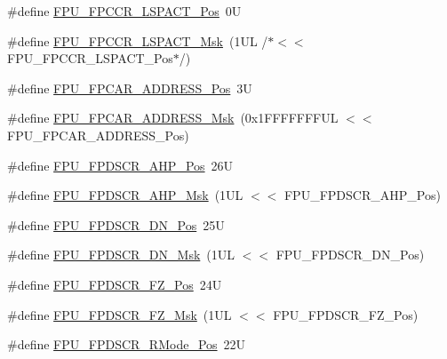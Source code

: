 \begin{DoxyCompactItemize}
\item 
\#define \mbox{\hyperlink{group___c_m_s_i_s___f_p_u_ga803bf3f6d15b04deaad0801bee5b35ed}{F\+P\+U\+\_\+\+F\+P\+C\+C\+R\+\_\+\+L\+S\+P\+A\+C\+T\+\_\+\+Pos}}~0U
\item 
\#define \mbox{\hyperlink{group___c_m_s_i_s___f_p_u_ga86e7c2fa52ba65c3b535dfa33f2586eb}{F\+P\+U\+\_\+\+F\+P\+C\+C\+R\+\_\+\+L\+S\+P\+A\+C\+T\+\_\+\+Msk}}~(1\+U\+L /$\ast$$<$$<$ F\+P\+U\+\_\+\+F\+P\+C\+C\+R\+\_\+\+L\+S\+P\+A\+C\+T\+\_\+\+Pos$\ast$/)
\item 
\#define \mbox{\hyperlink{group___c_m_s_i_s___f_p_u_gaf45377b7e45be8517ddbcf2028b80ae7}{F\+P\+U\+\_\+\+F\+P\+C\+A\+R\+\_\+\+A\+D\+D\+R\+E\+S\+S\+\_\+\+Pos}}~3U
\item 
\#define \mbox{\hyperlink{group___c_m_s_i_s___f_p_u_ga517d89370c81325c5387b9c3085ac554}{F\+P\+U\+\_\+\+F\+P\+C\+A\+R\+\_\+\+A\+D\+D\+R\+E\+S\+S\+\_\+\+Msk}}~(0x1\+F\+F\+F\+F\+F\+F\+F\+U\+L $<$$<$ F\+P\+U\+\_\+\+F\+P\+C\+A\+R\+\_\+\+A\+D\+D\+R\+E\+S\+S\+\_\+\+Pos)
\item 
\#define \mbox{\hyperlink{group___c_m_s_i_s___f_p_u_ga138f54bc002629ab3e4de814c58abb29}{F\+P\+U\+\_\+\+F\+P\+D\+S\+C\+R\+\_\+\+A\+H\+P\+\_\+\+Pos}}~26U
\item 
\#define \mbox{\hyperlink{group___c_m_s_i_s___f_p_u_gab2789cebebda5fda8c4e9d87e24f32be}{F\+P\+U\+\_\+\+F\+P\+D\+S\+C\+R\+\_\+\+A\+H\+P\+\_\+\+Msk}}~(1\+U\+L $<$$<$ F\+P\+U\+\_\+\+F\+P\+D\+S\+C\+R\+\_\+\+A\+H\+P\+\_\+\+Pos)
\item 
\#define \mbox{\hyperlink{group___c_m_s_i_s___f_p_u_ga41776b80fa450ef2ea6d3fee89aa35f2}{F\+P\+U\+\_\+\+F\+P\+D\+S\+C\+R\+\_\+\+D\+N\+\_\+\+Pos}}~25U
\item 
\#define \mbox{\hyperlink{group___c_m_s_i_s___f_p_u_ga40c2d4a297ca2ceffe174703a4ad17f6}{F\+P\+U\+\_\+\+F\+P\+D\+S\+C\+R\+\_\+\+D\+N\+\_\+\+Msk}}~(1\+U\+L $<$$<$ F\+P\+U\+\_\+\+F\+P\+D\+S\+C\+R\+\_\+\+D\+N\+\_\+\+Pos)
\item 
\#define \mbox{\hyperlink{group___c_m_s_i_s___f_p_u_gab3c2fc96e312ba47b902d5f80d9b8575}{F\+P\+U\+\_\+\+F\+P\+D\+S\+C\+R\+\_\+\+F\+Z\+\_\+\+Pos}}~24U
\item 
\#define \mbox{\hyperlink{group___c_m_s_i_s___f_p_u_gaae7d901442d4af97c6d22939cffc8ad9}{F\+P\+U\+\_\+\+F\+P\+D\+S\+C\+R\+\_\+\+F\+Z\+\_\+\+Msk}}~(1\+U\+L $<$$<$ F\+P\+U\+\_\+\+F\+P\+D\+S\+C\+R\+\_\+\+F\+Z\+\_\+\+Pos)
\item 
\#define \mbox{\hyperlink{group___c_m_s_i_s___f_p_u_ga7aeedf36be8f170dd3e276028e8e29ed}{F\+P\+U\+\_\+\+F\+P\+D\+S\+C\+R\+\_\+\+R\+Mode\+\_\+\+Pos}}~22U

\end{DoxyCompactItemize}
